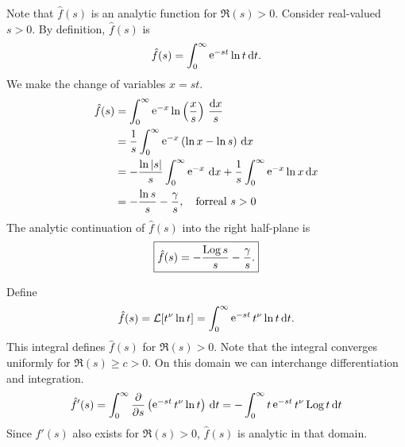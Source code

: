 {%
\begin{Solution}
  \label{solution L(ln t)}
  Note that $\hat{f}(s)$ is an analytic function for $\Re(s) > 0$.  
  Consider real-valued $s > 0$.  By definition, $\hat{f}(s)$ is 
  \[
  \hat{f}(s) = \int_0^\infty \mathop{\mathrm{e}}\nolimits^{-s t} \ln t \,\mathrm{d} t.
  \]
  We make the change of variables $x = s t$.
  \begin{align*}
    \hat{f}(s)
    &= \int_0^\infty \mathop{\mathrm{e}}\nolimits^{-x} \ln \left( \frac{x}{s} \right) \, \frac{\mathrm{d} x}{s} \\
    &= \frac{1}{s} \int_0^\infty \mathop{\mathrm{e}}\nolimits^{-x} \left( \ln x - \ln s \right) \,\mathrm{d} x \\
    &= - \frac{\ln |s|}{s} \int_0^\infty \mathop{\mathrm{e}}\nolimits^{-x} \,\mathrm{d} x 
    + \frac{1}{s} \int_0^\infty \mathop{\mathrm{e}}\nolimits^{-x} \ln x \,\mathrm{d} x \\
    &= - \frac{\ln s}{s} - \frac{\gamma}{s}, \quad \mathrm{for real}\ s > 0
  \end{align*}
  The analytic continuation of $\hat{f}(s)$ into the right half-plane is
  \[ 
  \boxed{
    \hat{f}(s) = - \frac{\mathop{\mathrm{Log}}\nolimits s}{s} - \frac{\gamma}{s}.
    }
  \]
\end{Solution}







\begin{Solution}
  \label{solution L(t nu ln t)}
  Define
  \[
  \hat{f}(s) = \mathcal{L}[t^\nu \ln t] = \int_0^\infty \mathop{\mathrm{e}}\nolimits^{-s t} t^\nu \ln t \,\mathrm{d} t.
  \]
  This integral defines $\hat{f}(s)$ for $\Re(s) > 0$.  Note that the integral
  converges uniformly for $\Re(s) \geq c > 0$.  On this domain we can
  interchange differentiation and integration.
  \[
  \hat{f}'(s) = \int_0^\infty \frac{\partial}{\partial s} \left( \mathop{\mathrm{e}}\nolimits^{-s t} t^\nu \ln t \right) \,\mathrm{d} t
  = - \int_0^\infty t \mathop{\mathrm{e}}\nolimits^{-s t} t^\nu \mathop{\mathrm{Log}}\nolimits t \,\mathrm{d} t
  \]
  Since $\hat{f}'(s)$ also exists for $\Re(s) > 0$, 
  $\hat{f}(s)$ is analytic in that domain.


\end{Solution}}
